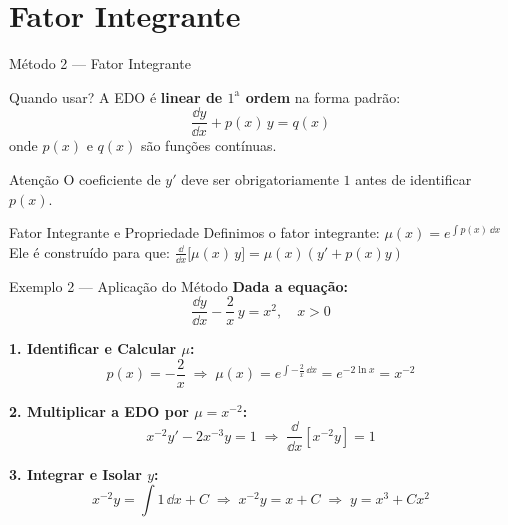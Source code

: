 \documentclass[11pt, aspectratio=169, xcolor=table]{beamer}
\begin{document}
\section{Fator Integrante}

\begin{frame}{Método 2 --- Fator Integrante}
\begin{block}{Quando usar?}
A EDO é \textbf{linear de $1^{\text{a}}$ ordem} na forma padrão:
\[
\frac{\dd y}{\dd x} + p(x)\,y = q(x)
\]
onde \(p(x)\) e \(q(x)\) são funções contínuas.
\end{block}

\begin{alertblock}{Atenção}
O coeficiente de \(y'\) deve ser obrigatoriamente \(1\) antes de identificar \(p(x)\).
\end{alertblock}
\end{frame}

\begin{frame}
\begin{block}{Fator Integrante e Propriedade}
Definimos o fator integrante: $\displaystyle \mu(x)=e^{\int p(x)\,\dd x}$
\\
Ele é construído para que: $\displaystyle \frac{\dd}{\dd x}\bigl[\mu(x)\,y\bigr] = \mu(x)\left( y' + p(x)y \right)$
\end{block}
\end{frame}

\begin{frame}{Exemplo 2 --- Aplicação do Método}
\textbf{Dada a equação:}
\[
\frac{\dd y}{\dd x} - \frac{2}{x}\,y = x^2,\quad x>0
\]
\end{frame}

\begin{frame}
\textbf{1. Identificar e Calcular \(\mu\):}
\[
p(x)=-\frac{2}{x} \;\Longrightarrow\; \mu(x)=e^{\int -\frac{2}{x}\,\dd x} = e^{-2\ln x} = x^{-2}
\]

\textbf{2. Multiplicar a EDO por $\mu=x^{-2}$:}
\[
x^{-2}y' - 2x^{-3}y = 1 \;\Longrightarrow\; \frac{\dd}{\dd x}\!\left[x^{-2}y\right] = 1
\]

\textbf{3. Integrar e Isolar $y$:}
\[
x^{-2}y = \int 1\,\dd x + C \;\Longrightarrow\; x^{-2}y = x + C \;\Longrightarrow\; \boxed{y = x^3 + Cx^2}
\]
\end{frame}
\end{document}
